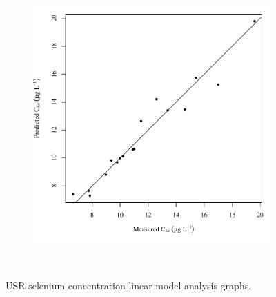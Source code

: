 \begin{landscape}
\begin{figure}
\begin{subfigure}{0.7\textwidth}
			\includegraphics[width=\tableCustomSize]{"Figures/Results_USR/Stochastic/Conc Model pred v meas CAN"}
		\end{subfigure}\\
		\caption{USR selenium concentration linear model analysis graphs.}
	\end{figure}
\end{landscape}

